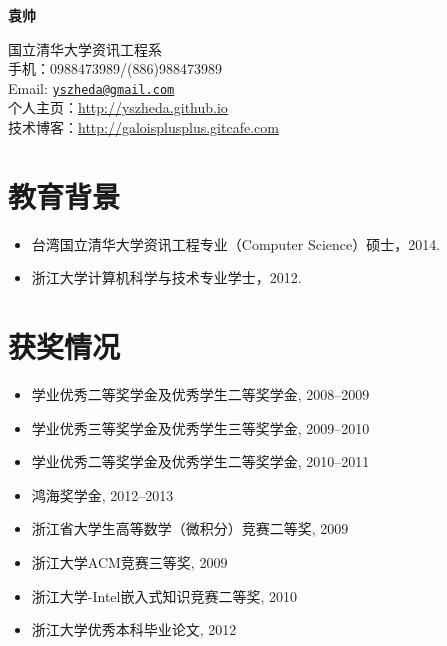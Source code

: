 \documentclass[letterpaper]{article}
\def\name{袁帅}
\begin{document}
\centerline{\huge\bf \name} \vspace{0.25in}
\begin{minipage}[t]{0.8\textwidth}
国立清华大学资讯工程系 \\
手机：0988473989/(886)988473989   \\
Email: \href{mailto:yszheda@gmail.com}{\tt yszheda@gmail.com}\\
个人主页：\url{http://yszheda.github.io} \\
技术博客：\url{http://galoisplusplus.gitcafe.com}
\end{minipage}

\section*{教育背景}
\begin{itemize}
\item 台湾国立清华大学资讯工程专业（Computer Science）硕士，2014.
\item 浙江大学计算机科学与技术专业学士，2012.
\end{itemize}

\section*{获奖情况}
\begin{itemize}
  \item 学业优秀二等奖学金及优秀学生二等奖学金, 2008--2009
  \item 学业优秀三等奖学金及优秀学生三等奖学金, 2009--2010
  \item 学业优秀二等奖学金及优秀学生二等奖学金, 2010--2011
  \item 鸿海奖学金, 2012--2013				
  \item 浙江省大学生高等数学（微积分）竞赛二等奖, 2009
  \item 浙江大学ACM竞赛三等奖, 2009
  \item 浙江大学-Intel嵌入式知识竞赛二等奖, 2010
  \item 浙江大学优秀本科毕业论文, 2012
\end{itemize}
\end{document}
